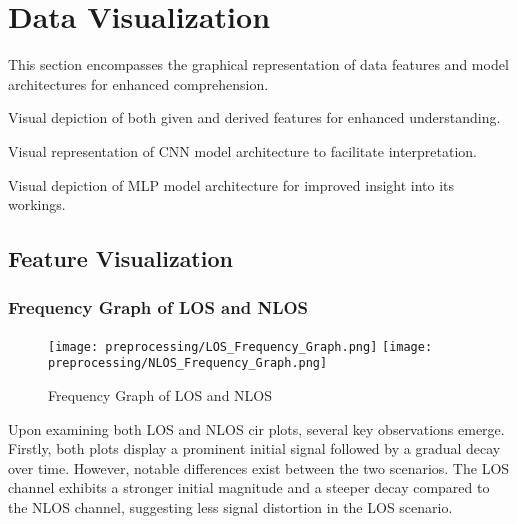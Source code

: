 \section{Data Visualization}\label{data_visualisation}

This section encompasses the graphical representation of data features and model architectures for enhanced comprehension.

\begin{description}[style=nextline]
    \item[Feature Visualization:] Visual depiction of both given and derived features for enhanced understanding.
    \item[Convolution Neural Network:] Visual representation of CNN model architecture to facilitate interpretation.
    \item[Multilayer Perceptron:] Visual depiction of MLP model architecture for improved insight into its workings.
\end{description}



\subsection{Feature Visualization}\label{feature_visualization}

\subsubsection{Frequency Graph of LOS and NLOS}\label{frequency_graph}

\begin{figure}[H] 
	\centering
	\texttt{[image: preprocessing/LOS\_Frequency\_Graph.png]}
	\texttt{[image: preprocessing/NLOS\_Frequency\_Graph.png]}
	\caption{Frequency Graph of LOS and NLOS}\label{fig:frequency_graph}
\end{figure}


Upon examining both LOS and NLOS \acrshort{cir} plots, several key observations emerge. Firstly, both plots display a prominent initial signal followed by a gradual decay over time. However, notable differences exist between the two scenarios. The LOS channel exhibits a stronger initial magnitude and a steeper decay compared to the NLOS channel, suggesting less signal distortion in the LOS scenario.

